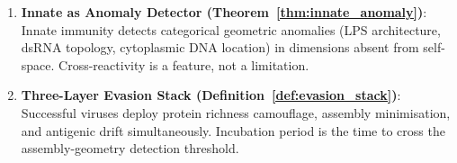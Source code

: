 \begin{chapterbox}[title=Chapter 24 --- Key Results Established]
\begin{enumerate}[label=\textbf{\arabic*.}]
  \item \textbf{Innate as Anomaly Detector (Theorem~\ref{thm:innate_anomaly})}:
        Innate immunity detects categorical geometric anomalies (LPS architecture,
        dsRNA topology, cytoplasmic DNA location) in dimensions absent from
        self-space. Cross-reactivity is a feature, not a limitation.

  \item \textbf{Three-Layer Evasion Stack (Definition~\ref{def:evasion_stack})}:
        Successful viruses deploy protein richness camouflage, assembly
        minimisation, and antigenic drift simultaneously. Incubation period is
        the time to cross the assembly-geometry detection threshold.
\end{enumerate}
\end{chapterbox}
